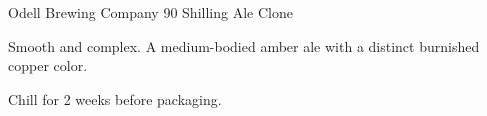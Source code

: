 \begin{recipe}{Odell Brewing Company 90 Shilling Ale Clone}

\begin{aboutblock}
Smooth and complex. A medium-bodied amber ale with a distinct burnished copper
color. \sourceaha
\end{aboutblock}


\begin{methodandtiming}

\begin{mashsteps}
\end{mashsteps}

\begin{fermentationsteps}
\end{fermentationsteps}

\begin{directions}
Chill for 2 weeks before packaging.
\end{directions}

\end{methodandtiming}

\recipebreak

\begin{ingredientsblock}

\begin{malts}
\end{malts}

\begin{hops}
\end{hops}


\end{ingredientsblock}

\end{recipe}

